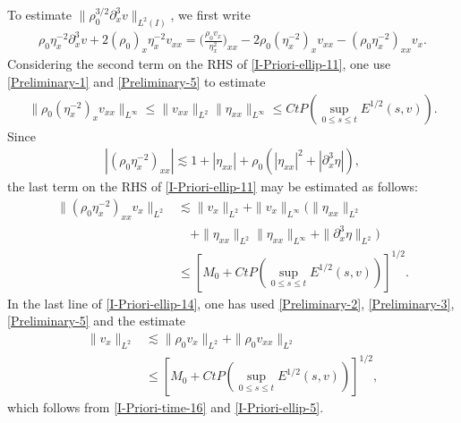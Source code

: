 \documentclass[11pt, reqno]{amsart}
\numberwithin{equation}{section}
\begin{document}
To estimate \(\|\rho_0^{3/2}\partial_x^3v\|_{L^2(I)}\), we first write
\begin{equation}\label{I-Priori-ellip-11}
\begin{aligned}
\rho_0\eta_x^{-2}\partial_x^3v+2(\rho_0)_x\eta_x^{-2}v_{xx}=\bigg({\frac{\rho_0v_x}{\eta_x^2}}\bigg)_{xx}
-2\rho_0(\eta_x^{-2})_{x}v_{xx}-(\rho_0\eta_x^{-2})_{xx}v_x.
\end{aligned}
\end{equation}
Considering the second term on the RHS of \eqref{I-Priori-ellip-11}, one use \eqref{Preliminary-1} and \eqref{Preliminary-5} to estimate
\begin{equation}\label{I-Priori-ellip-12}
\begin{aligned}
\|\rho_0(\eta_x^{-2})_{x}v_{xx}\|_{L^\infty}
\leq \|v_{xx}\|_{L^2}\|\eta_{xx}\|_{L^\infty}
\leq Ct P(\sup_{0\leq s\leq t}E^{1/2}(s,v)).
\end{aligned}
\end{equation}
Since
\begin{equation}\label{I-Priori-ellip-13}
\begin{aligned}
|(\rho_0\eta_x^{-2})_{xx}|\lesssim 1+|\eta_{xx}|+\rho_0(|\eta_{xx}|^2+|\partial_x^3\eta|),
\end{aligned}
\end{equation}
the last term on the RHS of \eqref{I-Priori-ellip-11} may be estimated as follows:
\begin{equation}\label{I-Priori-ellip-14}
\begin{aligned}
\|(\rho_0\eta_x^{-2})_{xx}v_x\|_{L^2}
&\lesssim \|v_x\|_{L^2}+
\|v_x\|_{L^\infty}(\|\eta_{xx}\|_{L^2}\\
&\quad+\|\eta_{xx}\|_{L^2}\|\eta_{xx}\|_{L^\infty}
+\|\partial_x^3\eta\|_{L^2})\\
&\leq [M_0+Ct P(\sup_{0\leq s\leq t}E^{1/2}(s,v))]^{1/2}.
\end{aligned}
\end{equation}
In the last line of \eqref{I-Priori-ellip-14}, one has used \eqref{Preliminary-2}, \eqref{Preliminary-3}, \eqref{Preliminary-5} and the estimate
\begin{equation}\label{I-Priori-ellip-15}
\begin{aligned}
\|v_x\|_{L^2}
&\lesssim \|\rho_0v_x\|_{L^2}+\|\rho_0v_{xx}\|_{L^2}\\
&\leq [M_0+Ct P(\sup_{0\leq s\leq t}E^{1/2}(s,v))]^{1/2},
\end{aligned}
\end{equation}
which follows from \eqref{I-Priori-time-16} and \eqref{I-Priori-ellip-5}.
\end{document}
